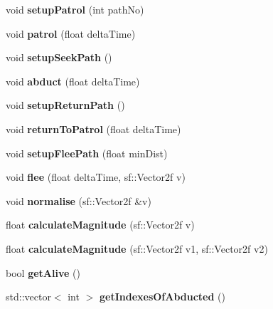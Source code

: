 \begin{DoxyCompactItemize}
\item 
\mbox{\label{class_sweeper_boid_ae2e5c623aa6d8675eddf5ba2470539cb}} 
void {\bfseries setup\+Patrol} (int path\+No)
\item 
\mbox{\label{class_sweeper_boid_ad0bba56551cd9fa781c8d04fc6c1c361}} 
void {\bfseries patrol} (float delta\+Time)
\item 
\mbox{\label{class_sweeper_boid_a7342a56a2441de343c42eee27728857b}} 
void {\bfseries setup\+Seek\+Path} ()
\item 
\mbox{\label{class_sweeper_boid_abe27341c9ac74d29d6c35960f8e5d873}} 
void {\bfseries abduct} (float delta\+Time)
\item 
\mbox{\label{class_sweeper_boid_abc52f564c73c8083921653477e327700}} 
void {\bfseries setup\+Return\+Path} ()
\item 
\mbox{\label{class_sweeper_boid_a6ecd02773c903b57b25aec9fd415b184}} 
void {\bfseries return\+To\+Patrol} (float delta\+Time)
\item 
\mbox{\label{class_sweeper_boid_a39023985f11037212b4c40f55cecf306}} 
void {\bfseries setup\+Flee\+Path} (float min\+Dist)
\item 
\mbox{\label{class_sweeper_boid_a475e95d6f874ebce01b6904bd85193ea}} 
void {\bfseries flee} (float delta\+Time, sf\+::\+Vector2f v)
\item 
\mbox{\label{class_sweeper_boid_a065ded798eb1b37ab4cc9944824795c9}} 
void {\bfseries normalise} (sf\+::\+Vector2f \&v)
\item 
\mbox{\label{class_sweeper_boid_a91e883fffbab6b77c509cd4a482a8137}} 
float {\bfseries calculate\+Magnitude} (sf\+::\+Vector2f v)
\item 
\mbox{\label{class_sweeper_boid_a148901a7afea04b6bab331053e15655a}} 
float {\bfseries calculate\+Magnitude} (sf\+::\+Vector2f v1, sf\+::\+Vector2f v2)
\item 
\mbox{\label{class_sweeper_boid_af33a3a064c32fe372475b9e3722f9630}} 
bool {\bfseries get\+Alive} ()
\item 
\mbox{\label{class_sweeper_boid_a1b7a0488528da4843f0821b555b14d0f}} 
std\+::vector$<$ int $>$ {\bfseries get\+Indexes\+Of\+Abducted} ()
\end{DoxyCompactItemize}


